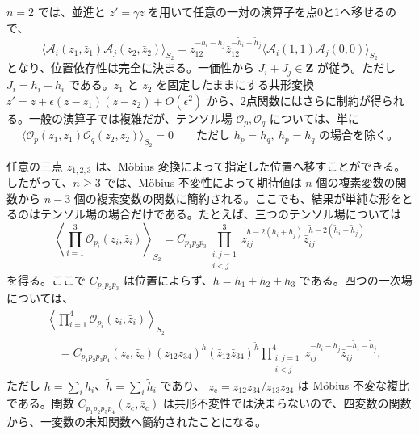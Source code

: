 $n=2$ では、並進と $z'=\gamma z$ を用いて任意の一対の演算子を点0と1へ移せるので、
\begin{equation}
\langle\mathcal A_i(z_1,\bar z_1)\mathcal A_j(z_2,\bar z_2)\rangle_{S_2}
=z_{12}^{-h_i-h_j}\bar z_{12}^{-\widetilde h_i-\widetilde h_j}
\langle\mathcal A_i(1,1)\mathcal A_j(0,0)\rangle_{S_2}
\tag{6.7.4}\label{eq:6.7.4}
\end{equation}
となり、位置依存性は完全に決まる。一価性から $J_i+J_j\in\mathbf Z$ が従う。ただし $J_i=h_i-\widetilde h_i$ である。$z_1$ と $z_2$ を固定したままにする共形変換
$z'=z+\epsilon(z-z_1)(z-z_2)+O(\epsilon^2)$
から、2点関数にはさらに制約が得られる。一般の演算子では複雑だが、テンソル場 $\mathcal O_p,\mathcal O_q$ については、単に
\begin{equation}
\langle\mathcal O_p(z_1,\bar z_1)\mathcal O_q(z_2,\bar z_2)\rangle_{S_2}=0
\qquad\text{ただし }h_p=h_q,\ \widetilde h_p=\widetilde h_q
\text{ の場合を除く。}
\tag{6.7.5}\label{eq:6.7.5}
\end{equation}

任意の三点 $z_{1,2,3}$ は、Möbius 変換によって指定した位置へ移すことができる。したがって、$n\geq3$ では、Möbius 不変性によって期待値は $n$ 個の複素変数の関数から $n-3$ 個の複素変数の関数に簡約される。ここでも、結果が単純な形をとるのはテンソル場の場合だけである。たとえば、三つのテンソル場については
\begin{equation}
\left\langle\prod_{i=1}^{3}\mathcal O_{p_i}(z_i,\bar z_i)\right\rangle_{S_2}
=C_{p_1p_2p_3}
\prod_{\substack{i,j=1\\i<j}}^{3}
z_{ij}^{h-2(h_i+h_j)}
\bar z_{ij}^{\widetilde h-2(\widetilde h_i+\widetilde h_j)}
\tag{6.7.6}\label{eq:6.7.6}
\end{equation}
を得る。ここで $C_{p_1p_2p_3}$ は位置によらず、$h=h_1+h_2+h_3$ である。四つの一次場については、
\begin{equation}
\begin{aligned}
&\left\langle\prod_{i=1}^{4}\mathcal O_{p_i}(z_i,\bar z_i)\right\rangle_{S_2}\\
&\quad=C_{p_1p_2p_3p_4}(z_{\mathrm c},\bar z_{\mathrm c})
(z_{12}z_{34})^h(\bar z_{12}\bar z_{34})^{\widetilde h}
\prod_{\substack{i,j=1\\i<j}}^{4}
z_{ij}^{-h_i-h_j}\bar z_{ij}^{-\widetilde h_i-\widetilde h_j},
\end{aligned}
\tag{6.7.7}\label{eq:6.7.7}
\end{equation}
ただし $h=\sum_i h_i$、$\widetilde h=\sum_i\widetilde h_i$ であり、
$z_{\mathrm c}=z_{12}z_{34}/z_{13}z_{24}$
は Möbius 不変な複比である。関数 $C_{p_1p_2p_3p_4}(z_{\mathrm c},\bar z_{\mathrm c})$ は共形不変性では決まらないので、四変数の関数から、一変数の未知関数へ簡約されたことになる。

